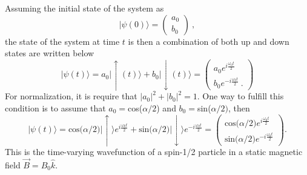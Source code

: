 Assuming the initial state of the system as
\begin{equation}
\label{eqn:psi0}
|\psi(0)\rangle = \begin{pmatrix}
        a_{0} \\
        b_{0}
     \end{pmatrix}~,
\end{equation}
the state of the system at time $t$ is then a combination of both up and down states are written below
\begin{equation}
  |\psi(t)\rangle = a_{0}|\uparrow(t)\rangle + b_{0}|\downarrow(t)\rangle = \begin{pmatrix}
    a_{0} e^{i \frac{\omega_{0}t}{2}} \\
    b_{0}e^{-i \frac{\omega_{0}t}{2}}~.
     \end{pmatrix}
\end{equation}
For normalization, it is require that $|a_{0}|^{2}+|b_{0}|^2 = 1$.
One way to fulfill this condition is to assume that
$a_{0} = $cos($\alpha /2$) and $b_{0} = $sin($\alpha /2)$, then
\begin{equation}
  \label{eqn:psi}
  |\psi(t)\rangle = \textrm{cos($\alpha$/2)}|\uparrow\rangle e^{i \frac{\omega_{0}t}{2}} + \textrm{sin($\alpha$/2)}|\downarrow\rangle e^{-i \frac{\omega_{0}t}{2}} = \begin{pmatrix}
    \textrm{cos($\alpha$/2)} e^{i \frac{\omega_{0}t}{2}} \\
    \textrm{sin($\alpha$/2)} e^{-i \frac{\omega_{0}t}{2}}
     \end{pmatrix}.
\end{equation}
This is the time-varying wavefunction of a
spin-1/2 particle in a static magnetic field $\vec{B} = B_{0}\hat{k}$.


